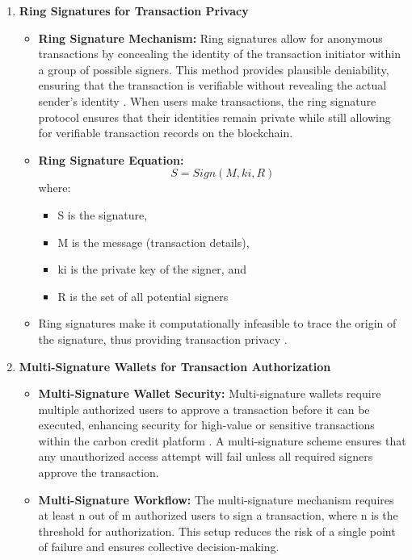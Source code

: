 \documentclass[preprint,12pt]{elsarticle}
\begin{document}
\begin{enumerate}
\begin{itemize}
\begin{itemize}
    \end{itemize}
\end{itemize}
\item \textbf{Ring Signatures for Transaction Privacy}
\begin{itemize}
    \item \textbf{Ring Signature Mechanism:}
Ring signatures allow for anonymous transactions by concealing the identity of the transaction initiator within a group of possible signers. This method provides plausible deniability, ensuring that the transaction is verifiable without revealing the actual sender's identity \citep{wong2019blockchain}. When users make transactions, the ring signature protocol ensures that their identities remain private while still allowing for verifiable transaction records on the blockchain.
\item \textbf{Ring Signature Equation:}
\[S=Sign(M,ki,R)\]
where:
\begin{itemize}
    \item S is the signature,
    \item M is the message (transaction details),
    \item ki is the private key of the signer, and
    \item R is the set of all potential signers
\end{itemize}
\item Ring signatures make it computationally infeasible to trace the origin of the signature, thus providing transaction privacy \citep{wong2019blockchain}.
\end{itemize}
\item \textbf{Multi-Signature Wallets for Transaction Authorization}
\begin{itemize}
    \item \textbf{Multi-Signature Wallet Security:}
Multi-signature wallets require multiple authorized users to approve a transaction before it can be executed, enhancing security for high-value or sensitive transactions within the carbon credit platform \citep{sasson2014zerocash}. A multi-signature scheme ensures that any unauthorized access attempt will fail unless all required signers approve the transaction.
\item \textbf{Multi-Signature Workflow:} 
The multi-signature mechanism requires at least n out of m authorized users to sign a transaction, where n is the threshold for authorization. This setup reduces the risk of a single point of failure and ensures collective decision-making.
\end{itemize}
\end{enumerate}
\end{document}
